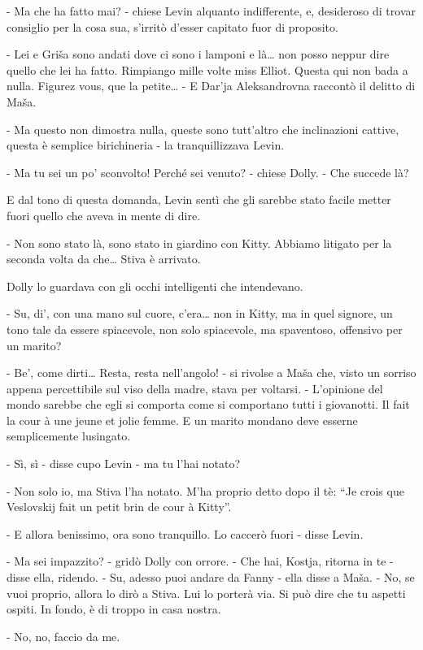 - Ma che ha fatto mai? - chiese Levin alquanto indifferente, e, desideroso di trovar consiglio per la cosa sua, s'irritò d'esser capitato fuor di proposito. 

- Lei e Griša sono andati dove ci sono i lamponi e là\ldots{} non posso neppur dire quello che lei ha fatto. Rimpiango mille volte miss Elliot. Questa qui non bada a nulla. Figurez vous, que la petite\ldots{} - E Dar'ja Aleksandrovna raccontò il delitto di Maša. 

- Ma questo non dimostra nulla, queste sono tutt'altro che inclinazioni cattive, questa è semplice birichineria - la tranquillizzava Levin. 

- Ma tu sei un po' sconvolto! Perché sei venuto? - chiese Dolly. - Che succede là? 

E dal tono di questa domanda, Levin sentì che gli sarebbe stato facile metter fuori quello che aveva in mente di dire. 

- Non sono stato là, sono stato in giardino con Kitty. Abbiamo litigato per la seconda volta da che\ldots{} Stiva è arrivato. 

Dolly lo guardava con gli occhi intelligenti che intendevano. 

- Su, di', con una mano sul cuore, c'era\ldots{} non in Kitty, ma in quel signore, un tono tale da essere spiacevole, non solo spiacevole, ma spaventoso, offensivo per un marito? 

- Be', come dirti\ldots{} Resta, resta nell'angolo! - si rivolse a Maša che, visto un sorriso appena percettibile sul viso della madre, stava per voltarsi. - L'opinione del mondo sarebbe che egli si comporta come si comportano tutti i giovanotti. Il fait la cour à une jeune et jolie femme. E un marito mondano deve esserne semplicemente lusingato. 

- Sì, sì - disse cupo Levin - ma tu l'hai notato? 

- Non solo io, ma Stiva l'ha notato. M'ha proprio detto dopo il tè: ``Je crois que Veslovskij fait un petit brin de cour à Kitty''. 

- E allora benissimo, ora sono tranquillo. Lo caccerò fuori - disse Levin. 

- Ma sei impazzito? - gridò Dolly con orrore. - Che hai, Kostja, ritorna in te - disse ella, ridendo. - Su, adesso puoi andare da Fanny - ella disse a Maša. - No, se vuoi proprio, allora lo dirò a Stiva. Lui lo porterà via. Si può dire che tu aspetti ospiti. In fondo, è di troppo in casa nostra. 

- No, no, faccio da me. 

